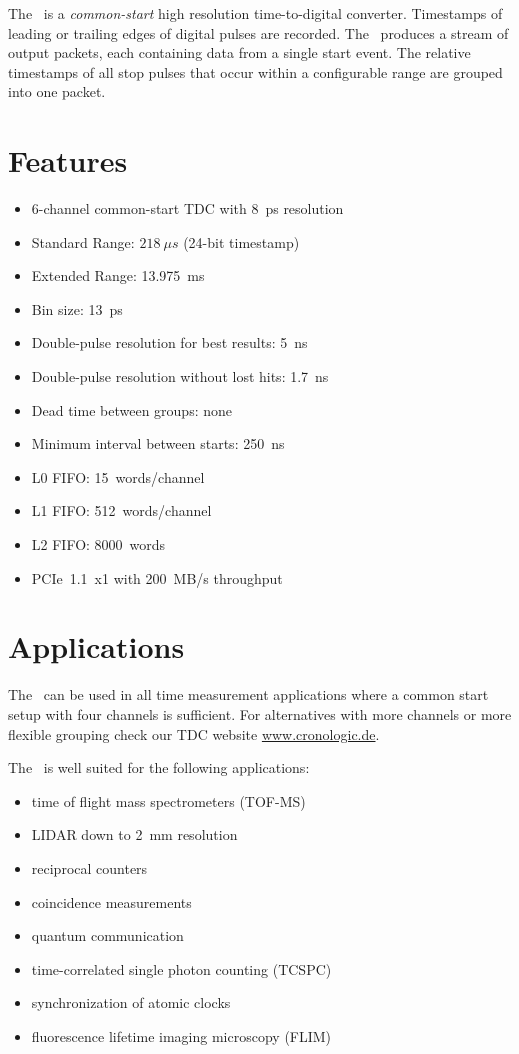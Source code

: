 The \deviceName\ is a \emph{common-start} high resolution time-to-digital converter. 
Timestamps of leading or trailing edges of digital pulses are recorded. 
The \deviceName\ produces a stream of output packets, each containing data from a single start event. 
The relative timestamps of all stop pulses that occur within a configurable range are grouped into one packet.

\section{Features}
	\begin{itemize}
		\item 6-channel common-start TDC with 8~ps resolution
		\item Standard Range: $218~\mu s$ (24-bit timestamp)
		\item Extended Range: 13.975~ms
		\item Bin size: 13~ps
		\item Double-pulse resolution for best results: 5~ns
		\item Double-pulse resolution without lost hits: 1.7~ns
		\item Dead time between groups: none
		\item Minimum interval between starts: 250~ns
		\item L0 FIFO: 15~words/channel
		\item L1 FIFO: 512~words/channel
		\item L2 FIFO: 8000~words
		\item PCIe~1.1~x1 with 200~MB/s throughput
	\end{itemize} 
\section{Applications}
The \deviceName\ can be used in all time measurement applications where a common start setup with four channels is sufficient. 
For alternatives with more channels or more flexible grouping check our TDC website \href{https://www.cronologic.de/produkte/products-overview#tdcdata}{www.cronologic.de}.

The \deviceName\ is well suited for the following applications:
\begin{itemize}
	\item time of flight mass spectrometers (TOF-MS)
	\item LIDAR down to 2~mm resolution
	\item reciprocal counters
	\item coincidence measurements
	\item quantum communication
	\item time-correlated single photon counting (TCSPC)
	\item synchronization of atomic clocks
	\item fluorescence lifetime imaging microscopy (FLIM)
\end{itemize} 